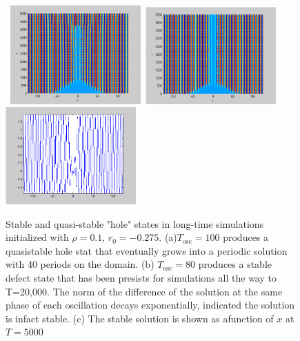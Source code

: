 \documentclass[pre,preprint,superscriptaddress]{revtex4-1}
\begin{document}
\begin{figure}[!htb]
\begin{center}
    \mbox{
\includegraphics[width=50mm]{HoleQuasiStableT100rD275.png}
\includegraphics[width=50mm]{HoleStableT80rD275.png}
\includegraphics[width=50mm]{HoleStableT80rD275sol.png}
}
\caption{Stable and quasi-stable "hole" states in long-time simulations initialized with $\rho=0.1$, $r_0=-0.275$.  (a)$T_{\text{osc}}=100$ produces a quasistable hole stat that eventually grows into a periodic solution with 40 periods on the domain.    (b) $T_{\text{osc}}=80$ produces a stable defect state that has been presists for simulations all the way to T=20,000.  The norm of the difference of the solution at the same phase of each oscillation decays exponentially, indicated the solution is infact stable.  (c) The stable solution is shown as afunction of $x$ at $T=5000$  }
    \label{fig:holes}
\end{center}
\end{figure}
\end{document}
